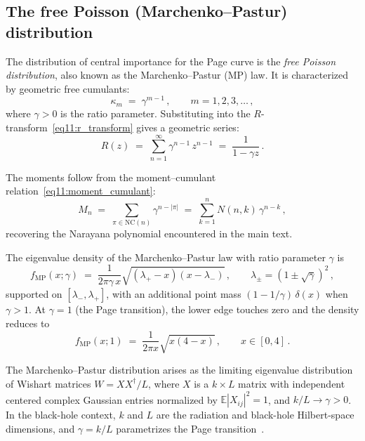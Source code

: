 \documentclass[11pt,letterpaper]{article}
\theoremstyle{plain}
\theoremstyle{definition}
\theoremstyle{remark}
\newcommand{\E}{\mathbb{E}}
\begin{document}
\subsection{The free Poisson (Marchenko--Pastur) distribution}
\label{subsec11:marchenko_pastur}

The distribution of central importance for the Page curve is the
\emph{free Poisson distribution}, also known as the Marchenko--Pastur
(MP) law.  It is characterized by geometric free cumulants:
\begin{equation}
\label{eq11:mp_free_cumulants}
  \kappa_m \;=\; \gamma^{m-1}\,,
  \qquad m = 1, 2, 3, \ldots\,,
\end{equation}
where $\gamma > 0$ is the ratio parameter.  Substituting into the
$R$-transform~\eqref{eq11:r_transform} gives a geometric series:
\begin{equation}
\label{eq11:mp_r_transform}
  R(z)
  \;=\;
  \sum_{n=1}^{\infty} \gamma^{n-1}\, z^{n-1}
  \;=\;
  \frac{1}{1 - \gamma z}\,.
\end{equation}

The moments follow from the moment--cumulant
relation~\eqref{eq11:moment_cumulant}:
\begin{equation}
\label{eq11:mp_moments}
  M_n
  \;=\;
  \sum_{\pi \in \mathrm{NC}(n)}
  \gamma^{n - |\pi|}
  \;=\;
  \sum_{k=1}^{n} N(n,k)\, \gamma^{n-k}\,,
\end{equation}
recovering the Narayana polynomial encountered in the main
text.

The eigenvalue density of the Marchenko--Pastur law with ratio parameter
$\gamma$ is
\begin{equation}
\label{eq11:mp_density}
  f_{\mathrm{MP}}(x;\gamma)
  \;=\;
  \frac{1}{2\pi\gamma\, x}
  \sqrt{(\lambda_+ - x)(x - \lambda_-)}\,,
  \qquad
  \lambda_{\pm} = (1 \pm \sqrt{\gamma})^2\,,
\end{equation}
supported on $[\lambda_-, \lambda_+]$, with an additional point mass
$(1 - 1/\gamma)\,\delta(x)$ when $\gamma > 1$.  At $\gamma = 1$ (the
Page transition), the lower edge touches zero and the density reduces to
\begin{equation}
\label{eq11:mp_page}
  f_{\mathrm{MP}}(x; 1)
  \;=\;
  \frac{1}{2\pi x}\sqrt{x(4-x)}\,,
  \qquad
  x \in [0, 4]\,.
\end{equation}

The Marchenko--Pastur distribution arises as the limiting eigenvalue
distribution of Wishart matrices $W = X X^\dagger / L$, where $X$ is a
$k \times L$ matrix with independent centered complex Gaussian entries
normalized by $\E|X_{ij}|^2=1$, and $k/L\to\gamma>0$. In the
black-hole context, $k$ and $L$ are the radiation and black-hole
Hilbert-space dimensions, and $\gamma = k/L$ parametrizes the Page
transition~\cite{wuebben2026a, page1993}.
\end{document}
